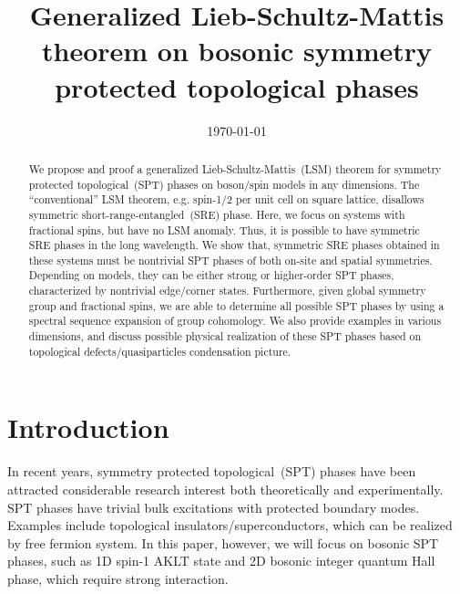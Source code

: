 \documentclass[%
  reprint,
  amsmath,amssymb,
  aps,pra,
]{revtex4-1}
\begin{document}
\title{Generalized Lieb-Schultz-Mattis theorem on bosonic symmetry protected topological phases}%

\date{\today}

\begin{abstract}
  We propose and proof a generalized Lieb-Schultz-Mattis~(LSM) theorem for symmetry protected topological~(SPT) phases on boson/spin models in any dimensions.
  The ``conventional'' LSM theorem, e.g. spin-1/2 per unit cell on square lattice, disallows symmetric short-range-entangled~(SRE) phase. 
  Here, we focus on systems with fractional spins, but have no LSM anomaly. 
  Thus, it is possible to have symmetric SRE phases in the long wavelength.
  We show that, symmetric SRE phases obtained in these systems must be nontrivial SPT phases of both on-site and spatial symmetries.
  Depending on models, they can be either strong or higher-order SPT phases, characterized by nontrivial edge/corner states.
  Furthermore, given global symmetry group and fractional spins, we are able to determine all possible SPT phases by using a spectral sequence expansion of group cohomology.
  We also provide examples in various dimensions, and discuss possible physical realization of these SPT phases based on topological defects/quasiparticles condensation picture.
\end{abstract}

\maketitle

\tableofcontents


\section{Introduction}\label{sec:intro}
In recent years, symmetry protected topological~(SPT) phases have been attracted considerable research interest both theoretically and experimentally.
SPT phases have trivial bulk excitations with protected boundary modes.
Examples include topological insulators/superconductors, which can be realized by free fermion system. 
In this paper, however, we will focus on bosonic SPT phases, such as 1D spin-1 AKLT state and 2D bosonic integer quantum Hall phase, which require strong interaction.
\end{document}
